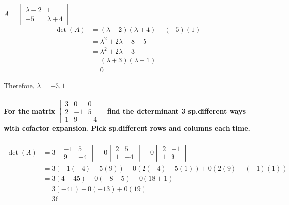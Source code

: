 \documentclass[
  letterpaper,
  DIV=11,
  numbers=noendperiod]{scrartcl}
\let\oldparagraph\paragraph
\renewcommand{\paragraph}[1]{\oldparagraph{#1}\mbox{}}
\begin{document}
\(A = \begin{bmatrix}\lambda-2 & 1 \\ -5 & \lambda+4\end{bmatrix}\)
\begin{align*}
\det(A) &= (\lambda-2)(\lambda+4)-(-5)(1) \\
&= \lambda^2+2\lambda-8+5 \\
&= \lambda^2+2\lambda-3 \\
&= (\lambda+3)(\lambda-1) \\
&= 0
\end{align*}

Therefore, \(\lambda = -3, 1\)

\newpage{}

\paragraph{\texorpdfstring{For the matrix
\(\begin{bmatrix}3 & 0 & 0 \\2 & -1 & 5 \\ 1 & 9 & -4\end{bmatrix}\)
find the determinant 3 sp.different ways with cofactor expansion. Pick
sp.different rows and columns each
time.}{For the matrix \textbackslash begin\{bmatrix\}3 \& 0 \& 0 \textbackslash\textbackslash2 \& -1 \& 5 \textbackslash\textbackslash{} 1 \& 9 \& -4\textbackslash end\{bmatrix\} find the determinant 3 sp.different ways with cofactor expansion. Pick sp.different rows and columns each time.}}\label{for-the-matrix-beginbmatrix3-0-0-2--1-5-1-9--4endbmatrix-find-the-determinant-3-sp.different-ways-with-cofactor-expansion.-pick-sp.different-rows-and-columns-each-time.}

\begin{align*}
\det(A) &= 3\begin{vmatrix}-1 & 5 \\ 9 & -4\end{vmatrix}-0\begin{vmatrix}2 & 5 \\ 1 & -4\end{vmatrix}+0\begin{vmatrix}2 & -1 \\ 1 & 9\end{vmatrix} \\
&= 3(-1(-4)-5(9))-0(2(-4)-5(1))+0(2(9)-(-1)(1)) \\
&= 3(4-45)-0(-8-5)+0(18+1) \\
&= 3(-41)-0(-13)+0(19) \\
&= 36
\end{align*}
\end{document}
